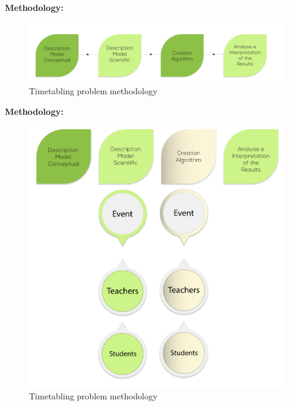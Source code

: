 \documentclass[centering]{report}
\newenvironment{slide}
    {\newpage
    \vspace*{\fill}
    }
    { 
     \vspace*{\fill}
    }
\begin{document}
\begin{slide}
\textbf{Methodology:}\\

\begin{figure}[h!]
  \centering
  \includegraphics[width=1.1\linewidth]{methodologyflow.png}
  \caption{\label{fig:methodologyflow}Timetabling problem methodology}
\end{figure}
\end{slide}


\begin{slide}
\textbf{Methodology:}\\

\begin{figure}[h!]
  \centering
  \includegraphics[width=0.7\linewidth]{methodologyflow2.png}
  \caption{\label{fig:methodologyflow2}Timetabling problem methodology}
\end{figure}
\end{slide}
\end{document}
